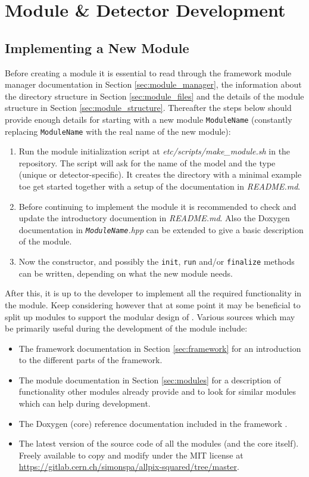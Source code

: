 \section{Module \& Detector Development}
\subsection{Implementing a New Module}
\label{sec:building_new_module}
Before creating a module it is essential to read through the framework module manager documentation in Section \ref{sec:module_manager}, the information about the directory structure in Section \ref{sec:module_files} and the details of the module structure in Section \ref{sec:module_structure}. Thereafter the steps below should provide enough details for starting with a new module \texttt{ModuleName} (constantly replacing  \texttt{ModuleName} with the real name of the new module):
\begin{enumerate}
\item Run the module initialization script at \textit{etc/scripts/make\_module.sh} in the repository. The script will ask for the name of the model and the type (unique or detector-specific). It creates the directory with a minimal example toe get started together with a setup of the documentation in \textit{README.md}.
\item Before continuing to implement the module it is recommended to check and update the introductory documention in \textit{README.md}. Also the Doxygen documentation in \textit{\texttt{ModuleName}.hpp} can be extended to give a basic description of the module.
\item Now the constructor, and possibly the \texttt{init}, \texttt{run} and/or \texttt{finalize} methods can be written, depending on what the new module needs.
\end{enumerate}

After this, it is up to the developer to implement all the required functionality in the module. Keep considering however that at some point it may be beneficial to split up modules to support the modular design of \apsq. Various sources which may be primarily useful during the development of the module include:
\begin{itemize}
\item The framework documentation in Section \ref{sec:framework} for an introduction to the different parts of the framework.
\item The module documentation in Section \ref{sec:modules} for a description of functionality other modules already provide and to look for similar modules which can help during development.
\item The Doxygen (core) reference documentation included in the framework .
\item The latest version of the source code of all the modules (and the core itself). Freely available to copy and modify under the MIT license at \url{https://gitlab.cern.ch/simonspa/allpix-squared/tree/master}.
\end{itemize}

